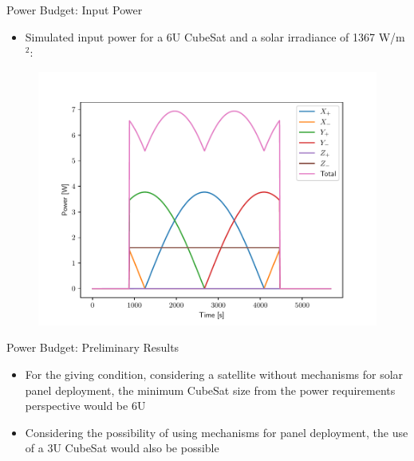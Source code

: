 \begin{frame}{Power Budget: Input Power}

    \begin{itemize}
        \item Simulated input power for a 6U CubeSat and a solar irradiance of 1367 W/m$^{2}$:
    \end{itemize}

    \begin{figure}[!ht]
        \begin{center}
            \includegraphics[width=0.7\columnwidth]{figures/sim-input-power-3u}
        \end{center}
    \end{figure}

\end{frame}

\begin{frame}{Power Budget: Preliminary Results}

    \begin{itemize}
        \item For the giving condition, considering a satellite without mechanisms for solar panel deployment, the minimum CubeSat size from the power requirements perspective would be 6U
        \vspace{0.2cm}
        \item Considering the possibility of using mechanisms for panel deployment, the use of a 3U CubeSat would also be possible
    \end{itemize}

\end{frame}

